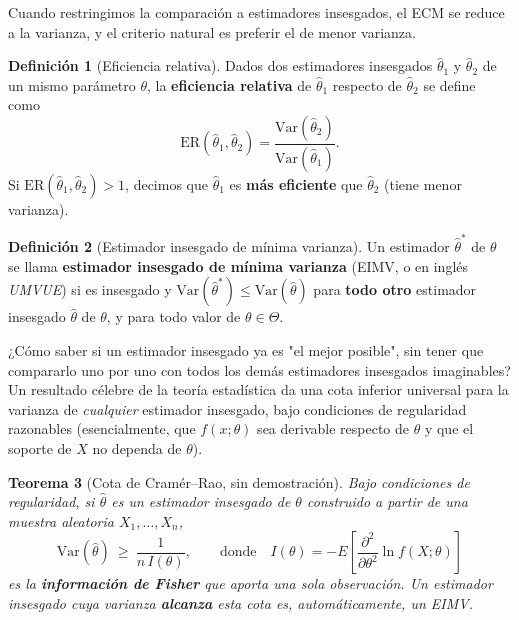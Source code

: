 \documentclass[11pt,a4paper]{article}
\theoremstyle{plain}
\newtheorem{teorema}{Teorema}[section]
\theoremstyle{definition}
\newtheorem{definicion}[teorema]{Definición}
\theoremstyle{remark}
\begin{document}
Cuando restringimos la comparación a estimadores insesgados, el ECM se reduce a la varianza, y el criterio natural es preferir el de menor varianza.

\begin{definicion}[Eficiencia relativa]
Dados dos estimadores insesgados $\widehat\theta_1$ y $\widehat\theta_2$ de un mismo parámetro $\theta$, la \textbf{eficiencia relativa} de $\widehat\theta_1$ respecto de $\widehat\theta_2$ se define como
\[
\mathrm{ER}(\widehat\theta_1,\widehat\theta_2) = \frac{\mathrm{Var}(\widehat\theta_2)}{\mathrm{Var}(\widehat\theta_1)}.
\]
Si $\mathrm{ER}(\widehat\theta_1,\widehat\theta_2)>1$, decimos que $\widehat\theta_1$ es \textbf{más eficiente} que $\widehat\theta_2$ (tiene menor varianza).
\end{definicion}

\begin{definicion}[Estimador insesgado de mínima varianza]
Un estimador $\widehat\theta^*$ de $\theta$ se llama \textbf{estimador insesgado de mínima varianza} (EIMV, o en inglés \emph{UMVUE}) si es insesgado y $\mathrm{Var}(\widehat\theta^*)\le \mathrm{Var}(\widehat\theta)$ para \textbf{todo otro} estimador insesgado $\widehat\theta$ de $\theta$, y para todo valor de $\theta\in\Theta$.
\end{definicion}

¿Cómo saber si un estimador insesgado ya es "el mejor posible", sin tener que compararlo uno por uno con todos los demás estimadores insesgados imaginables? Un resultado célebre de la teoría estadística da una cota inferior universal para la varianza de \emph{cualquier} estimador insesgado, bajo condiciones de regularidad razonables (esencialmente, que $f(x;\theta)$ sea derivable respecto de $\theta$ y que el soporte de $X$ no dependa de $\theta$).

\begin{teorema}[Cota de Cramér--Rao, sin demostración]
Bajo condiciones de regularidad, si $\widehat\theta$ es un estimador insesgado de $\theta$ construido a partir de una muestra aleatoria $X_1,\dots,X_n$,
\[
\mathrm{Var}(\widehat\theta) \ \ge\ \frac{1}{n\,I(\theta)}, \qquad \text{donde}\quad I(\theta) = -E\left[\frac{\partial^2}{\partial\theta^2}\ln f(X;\theta)\right]
\]
es la \textbf{información de Fisher} que aporta una sola observación. Un estimador insesgado cuya varianza \textbf{alcanza} esta cota es, automáticamente, un EIMV.
\end{teorema}
\end{document}
